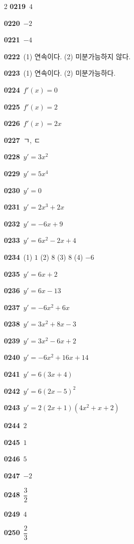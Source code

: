 \documentclass[10pt,a4paper]{article}
\begin{document}
\begin{multicols}{2}
\noindent\textbf{0219}\ $4$\par
\noindent\textbf{0220}\ $-2$\par
\noindent\textbf{0221}\ $-4$\par
\noindent\textbf{0222}\ (1) 연속이다. \quad (2) 미분가능하지 않다.\par
\noindent\textbf{0223}\ (1) 연속이다. \quad (2) 미분가능하다.\par
\noindent\textbf{0224}\ $f'(x)=0$\par
\noindent\textbf{0225}\ $f'(x)=2$\par
\noindent\textbf{0226}\ $f'(x)=2x$\par
\noindent\textbf{0227}\ ㄱ, ㄷ\par
\noindent\textbf{0228}\ $y'=3x^2$\par
\noindent\textbf{0229}\ $y'=5x^4$\par
\noindent\textbf{0230}\ $y'=0$\par
\noindent\textbf{0231}\ $y'=2x^3+2x$\par
\noindent\textbf{0232}\ $y'=-6x+9$\par
\noindent\textbf{0233}\ $y'=6x^2-2x+4$\par
\noindent\textbf{0234}\ (1) $1$ \quad (2) $8$ \quad (3) $8$ \quad (4) $-6$\par
\noindent\textbf{0235}\ $y'=6x+2$\par
\noindent\textbf{0236}\ $y'=6x-13$\par
\noindent\textbf{0237}\ $y'=-6x^2+6x$\par
\noindent\textbf{0238}\ $y'=3x^2+8x-3$\par
\noindent\textbf{0239}\ $y'=3x^2-6x+2$\par
\noindent\textbf{0240}\ $y'=-6x^2+16x+14$\par
\noindent\textbf{0241}\ $y'=6(3x+4)$\par
\noindent\textbf{0242}\ $y'=6(2x-5)^2$\par
\noindent\textbf{0243}\ $y'=2(2x+1)(4x^2+x+2)$\par
\noindent\textbf{0244}\ $2$\par
\noindent\textbf{0245}\ $1$\par
\noindent\textbf{0246}\ $5$\par
\noindent\textbf{0247}\ $-2$\par
\noindent\textbf{0248}\ $\dfrac{3}{2}$\par
\noindent\textbf{0249}\ $4$\par
\noindent\textbf{0250}\ $\dfrac{2}{3}$\par

\end{multicols}
\end{document}
